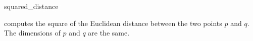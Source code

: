 \begin{ccRefFunction}{squared_distance}

{computes the square of the Euclidean distance between the two points
  $p$ and $q$. \ccPrecond The dimensions of $p$ and $q$ are the
  same.}

\end{ccRefFunction}
